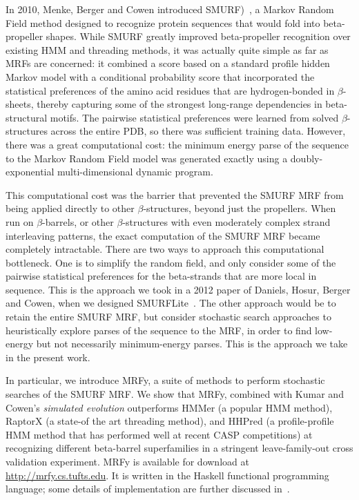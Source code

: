 \documentclass{acm_proc_article-sp}
\begin{document}
In 2010, Menke, Berger and Cowen introduced
SMURF)~\cite{Menke:2010ti}, a Markov Random Field method designed to
recognize protein sequences that would fold into beta-propeller
shapes. 
While SMURF greatly improved beta-propeller recognition over
existing HMM and threading methods, it was actually quite simple as
far as MRFs are concerned: it combined a score based on a standard profile 
hidden Markov model with a conditional probability score that incorporated
the statistical preferences of the amino acid residues that are
hydrogen-bonded in $\beta$-sheets, thereby capturing some of the
strongest long-range dependencies in beta-structural motifs.
The
pairwise statistical preferences were learned from solved
$\beta$-structures across the entire PDB, so there was sufficient
training data. 
However, there was a great computational cost: the
minimum energy parse of the sequence to the Markov Random Field model
was generated exactly using a doubly-exponential multi-dimensional
dynamic program.


This computational cost was the barrier that prevented the SMURF MRF
from being applied directly to other $\beta$-structures, beyond just
the propellers.  
When run on $\beta$-barrels, or other $\beta$-structures with
even moderately complex strand interleaving patterns, the exact
computation of the SMURF MRF became completely intractable. 
There are two ways to approach this computational bottleneck. 
One is to simplify the random field, and only consider some of the pairwise 
statistical preferences for the beta-strands that are more local in sequence.
This is the approach we took in a 2012 paper of Daniels, Hosur, Berger
and Cowen, when we designed SMURFLite~\cite{Daniels:2012dg}. 
The other approach would be to retain the entire SMURF MRF, but consider
stochastic search approaches to heuristically explore parses of the
sequence to the MRF, in order to find low-energy but not necessarily
minimum-energy parses.
This is the approach we take in the present work.

In particular, we introduce MRFy, a suite of methods to perform
stochastic searches of the SMURF MRF. 
We show that MRFy, combined with Kumar and Cowen's {\em simulated evolution\/} 
outperforms HMMer (a popular HMM method), RaptorX (a state-of the art threading 
method), and HHPred (a profile-profile HMM method that has performed well at 
recent CASP competitions) at recognizing different beta-barrel superfamilies
in a stringent leave-family-out cross validation experiment. 
MRFy is available for download at \url{http://mrfy.cs.tufts.edu}. 
It is written in the Haskell functional programming language; some details of 
implementation are further discussed in~\cite{Daniels:2012cm}.
\end{document}
